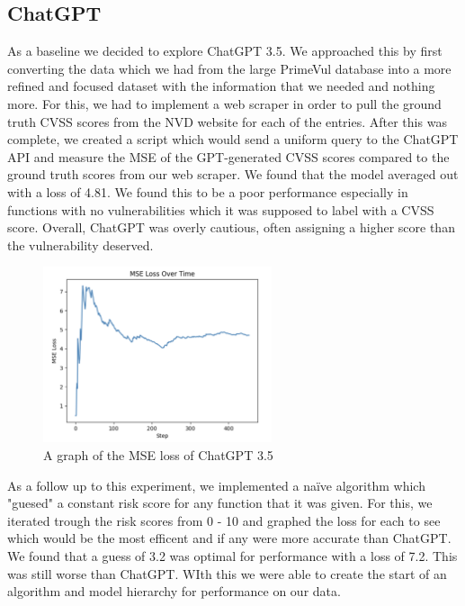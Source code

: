 \documentclass{article}
\begin{document}
\subsection{ChatGPT}
As a baseline we decided to explore ChatGPT 3.5. We approached this by first converting the data which we had
from the large PrimeVul database into a more refined and focused dataset with the information that we needed
and nothing more. For this, we had to implement a web scraper in order to pull the ground truth CVSS scores
from the NVD website for each of the entries. After this was complete, we created a script which would send a 
uniform query to the ChatGPT API and measure the MSE of the GPT-generated CVSS scores compared to the 
ground truth scores from our web scraper. We found that the model averaged out with a loss of 4.81. We found 
this to be a poor performance especially in functions with no vulnerabilities which it was supposed to 
label with a CVSS score. Overall, ChatGPT was overly cautious, often assigning a higher score than the 
vulnerability deserved.

\begin{figure}[htbp]
    \centering
    \includegraphics[width=0.6\textwidth]{images/gpt_loss.png}
    \caption{A graph of the MSE loss of ChatGPT 3.5}
    \label{fig:gpt_loss}
\end{figure}

As a follow up to this experiment, we implemented a naïve algorithm which "guesed" a constant risk score for
any function that it was given. For this, we iterated trough the risk scores from 0 - 10 and graphed the loss
for each to see which would be the most efficent and if any were more accurate than ChatGPT. We found that a 
guess of 3.2 was optimal for performance with a loss of 7.2. This was still worse than ChatGPT. WIth this we
were able to create the start of an algorithm and model hierarchy for performance on our data. 
\end{document}

